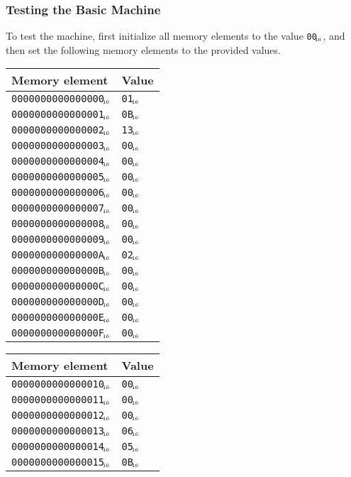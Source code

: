 \documentclass[a4paper,12pt]{article}
\newcommand{\num}[1]{\texttt{#1}\xspace}
\newcommand{\hex}[1]{\num{#1}$_{\textup{\tiny\hskip-1ex 16}}$\xspace}
\begin{document}
\subsubsection{Testing the Basic Machine}

To test the machine, first initialize all memory elements to the value \hex{00}, and then set the following memory elements to the provided values.

\begin{center}
  \begin{tabular}{@{}ll@{}}
    \hline
    Memory element         & Value \\
    \hline
    \hex{0000000000000000} & \hex{01} \\
    \hex{0000000000000001} & \hex{0B} \\
    \hex{0000000000000002} & \hex{13} \\
    \hex{0000000000000003} & \hex{00} \\
    \hex{0000000000000004} & \hex{00} \\
    \hex{0000000000000005} & \hex{00} \\
    \hex{0000000000000006} & \hex{00} \\
    \hex{0000000000000007} & \hex{00} \\
    \hex{0000000000000008} & \hex{00} \\
    \hex{0000000000000009} & \hex{00} \\
    \hex{000000000000000A} & \hex{02} \\
    \hex{000000000000000B} & \hex{00} \\
    \hex{000000000000000C} & \hex{00} \\
    \hex{000000000000000D} & \hex{00} \\
    \hex{000000000000000E} & \hex{00} \\
    \hex{000000000000000F} & \hex{00} \\
    \hline
  \end{tabular}
  \hfil
  \begin{tabular}{@{}ll@{}}
    \hline
    Memory element         & Value \\
    \hline
    \hex{0000000000000010} & \hex{00} \\
    \hex{0000000000000011} & \hex{00} \\
    \hex{0000000000000012} & \hex{00} \\
    \hex{0000000000000013} & \hex{06} \\
    \hex{0000000000000014} & \hex{05} \\
    \hex{0000000000000015} & \hex{0B} \\

\end{tabular}
\end{center}
\end{document}

